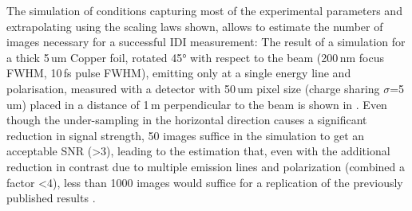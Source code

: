The simulation of conditions capturing most of the experimental parameters and extrapolating using the scaling laws shown, allows to estimate the number of images necessary for a successful IDI measurement: The result of a simulation for a thick 5\,um Copper foil, rotated 45° with respect to the beam (200\,nm focus FWHM, 10\,fs pulse FWHM), emitting only at a single energy line and polarisation, measured with a detector with 50\,um pixel size (charge sharing $\sigma$=5\,um) placed in a distance of 1\,m perpendicular to the beam is shown in . Even though the under-sampling in the horizontal direction causes a significant reduction in signal strength, 50 images suffice in the simulation to get an acceptable SNR (>3), leading to the estimation that, even with the additional reduction in contrast due to multiple emission lines and polarization (combined a factor <4), less than 1000 images would suffice for a replication of the previously published results \cite{nakumura2020}.

